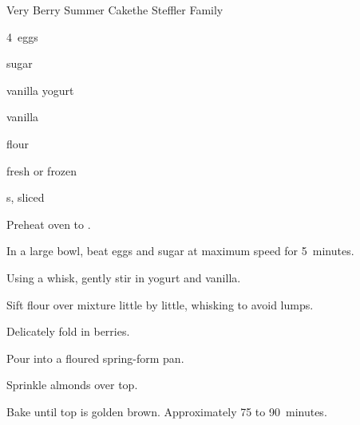 \begin{recipe}{Very Berry Summer Cake}{the Steffler Family}{}

\begin{ingredients}
\item 4~eggs
\item \C{\threequarter} sugar
\item {} vanilla yogurt
\item {} vanilla
\item \C{1\quarter} flour
\item {} fresh or frozen 
\item \C{\quarter} s, sliced 
\end{ingredients}

\begin{directions}
\item Preheat oven to .
\item In a large bowl, beat eggs and sugar at maximum speed for 5~minutes.
\item Using a whisk, gently stir in yogurt and vanilla.
\item Sift flour over mixture little by little, whisking to avoid lumps.
\item Delicately fold in berries.
\item Pour into a floured spring-form pan.
\item Sprinkle almonds over top.
\item Bake until top is golden brown. Approximately 75 to 90~minutes.
\end{directions}
\end{recipe}
